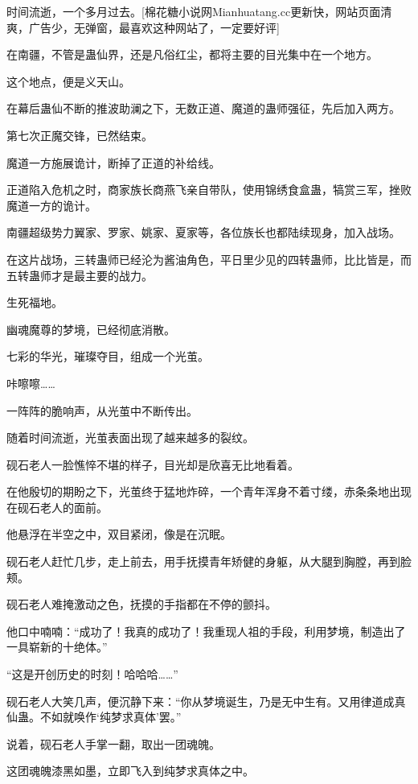 
\begin{this_body}

时间流逝，一个多月过去。[棉花糖小说网Mianhuatang.cc更新快，网站页面清爽，广告少，无弹窗，最喜欢这种网站了，一定要好评]

在南疆，不管是蛊仙界，还是凡俗红尘，都将主要的目光集中在一个地方。

这个地点，便是义天山。

在幕后蛊仙不断的推波助澜之下，无数正道、魔道的蛊师强征，先后加入两方。

第七次正魔交锋，已然结束。

魔道一方施展诡计，断掉了正道的补给线。

正道陷入危机之时，商家族长商燕飞亲自带队，使用锦绣食盒蛊，犒赏三军，挫败魔道一方的诡计。

南疆超级势力翼家、罗家、姚家、夏家等，各位族长也都陆续现身，加入战场。

在这片战场，三转蛊师已经沦为酱油角色，平日里少见的四转蛊师，比比皆是，而五转蛊师才是最主要的战力。

生死福地。

幽魂魔尊的梦境，已经彻底消散。

七彩的华光，璀璨夺目，组成一个光茧。

咔嚓嚓……

一阵阵的脆响声，从光茧中不断传出。

随着时间流逝，光茧表面出现了越来越多的裂纹。

砚石老人一脸憔悴不堪的样子，目光却是欣喜无比地看着。

在他殷切的期盼之下，光茧终于猛地炸碎，一个青年浑身不着寸缕，赤条条地出现在砚石老人的面前。

他悬浮在半空之中，双目紧闭，像是在沉眠。

砚石老人赶忙几步，走上前去，用手抚摸青年矫健的身躯，从大腿到胸膛，再到脸颊。

砚石老人难掩激动之色，抚摸的手指都在不停的颤抖。

他口中喃喃：“成功了！我真的成功了！我重现人祖的手段，利用梦境，制造出了一具崭新的十绝体。”

“这是开创历史的时刻！哈哈哈……”

砚石老人大笑几声，便沉静下来：“你从梦境诞生，乃是无中生有。又用律道成真仙蛊。不如就唤作‘纯梦求真体’罢。”

说着，砚石老人手掌一翻，取出一团魂魄。

这团魂魄漆黑如墨，立即飞入到纯梦求真体之中。


\end{this_body}
